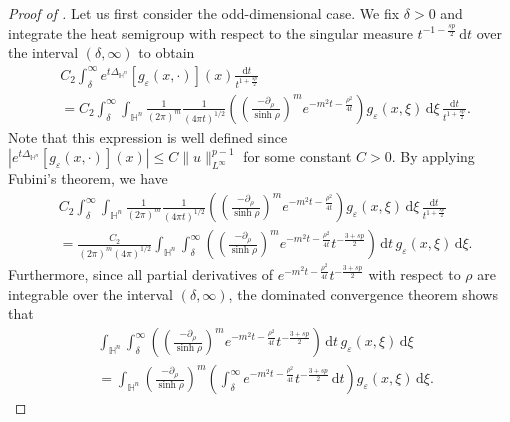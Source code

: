 \documentclass[11pt]{amsart}
\theoremstyle{plain}
\theoremstyle{definition}
\numberwithin{equation}{section}
\begin{document}
\begin{proof} [Proof of ]
Let us first consider the odd-dimensional case. We fix $\delta > 0$ and integrate the heat semigroup with respect to the singular measure $t^{-1-\frac{sp}{2}} \,\mathrm{d}t$ over the interval $(\delta, \infty)$ to obtain
\begin{equation} \label{eq:heat-semigroup-odd}
\begin{split}
&C_{2} \int_{\delta}^{\infty} e^{t\Delta_{\mathbb{H}^{n}}}[g_{\varepsilon}(x,\cdot)](x) \frac{\mathrm{d}t}{t^{1+\frac{sp}{2}}} \\
&= C_{2} \int_{\delta}^{\infty} \int_{\mathbb{H}^{n}} \frac{1}{(2\pi)^{m}} \frac{1}{(4\pi t)^{1/2}} \left( \left( \frac{-\partial_{\rho}}{\sinh \rho} \right)^{m} e^{-m^{2} t-\frac{\rho^2}{4t}} \right) g_{\varepsilon}(x,\xi) \,\mathrm{d}\xi \, \frac{\mathrm{d}t}{t^{1+\frac{sp}{2}}}.
\end{split}
\end{equation}
Note that this expression is well defined since $|e^{t\Delta_{\mathbb{H}^n}}[g_\varepsilon(x, \cdot)](x)| \leq C\|u\|_{L^\infty}^{p-1}$ for some constant $C>0$. By applying Fubini's theorem, we have
\begin{equation}\label{eq:heat-semigroup-odd2}
\begin{split}
&C_{2} \int_{\delta}^{\infty} \int_{\mathbb{H}^{n}} \frac{1}{(2\pi)^{m}} \frac{1}{(4\pi t)^{1/2}} \left( \left( \frac{-\partial_{\rho}}{\sinh \rho} \right)^{m} e^{-m^{2} t-\frac{\rho^2}{4t}} \right) g_{\varepsilon}(x,\xi) \,\mathrm{d}\xi \, \frac{\mathrm{d}t}{t^{1+\frac{sp}{2}}} \\
&= \frac{C_{2}}{(2\pi)^{m}(4\pi)^{1/2}} \int_{\mathbb{H}^{n}} \int_{\delta}^{\infty} \left( \left( \frac{-\partial_{\rho}}{\sinh \rho} \right)^{m} e^{-m^{2} t-\frac{\rho^2}{4t}}t^{-\frac{3+sp}{2}} \right) \, \mathrm{d}t \,g_{\varepsilon}(x,\xi) \,\mathrm{d}\xi.
\end{split}
\end{equation}
Furthermore, since all partial derivatives of $e^{-m^{2} t-\frac{\rho^2}{4t}}t^{-\frac{3+sp}{2}}$ with respect to $\rho$ are integrable over the interval $(\delta, \infty)$, the dominated convergence theorem shows that
\begin{equation}\label{eq:heat-semigroup-odd3}
\begin{split}
&\int_{\mathbb{H}^{n}} \int_{\delta}^{\infty} \left( \left( \frac{-\partial_{\rho}}{\sinh \rho} \right)^{m} e^{-m^{2} t-\frac{\rho^2}{4t}}t^{-\frac{3+sp}{2}} \right) \, \mathrm{d}t \,g_{\varepsilon}(x,\xi) \,\mathrm{d}\xi \\
&= \int_{\mathbb{H}^{n}} \left( \frac{-\partial_{\rho}}{\sinh \rho} \right)^{m} \left( \int_{\delta}^{\infty} e^{-m^{2} t-\frac{\rho^2}{4t}} t^{-\frac{3+sp}{2}} \, \mathrm{d}t \right) g_{\varepsilon}(x,\xi) \,\mathrm{d}\xi.

\end{split}
\end{equation}
\end{proof}
\end{document}
